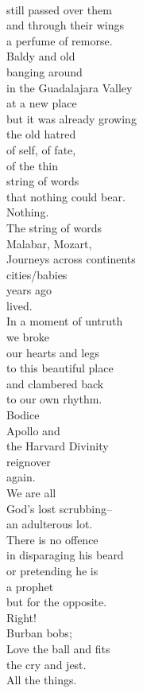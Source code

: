 \documentclass[smalldemyvopaper,11pt,twoside,onecolumn,openright,extrafontsizes]{memoir}
\begin{document}
\\still passed over them
\\and through their wings
\\a perfume of remorse.
\\Baldy and old
\\banging around
\\in the Guadalajara Valley
\\at a new place
\\but it was already growing
\\the old hatred
\\of self, of fate,
\\of the thin
\\string of words
\\that nothing could bear.
\\Nothing.
\\The string of words
\\Malabar, Mozart,
\\Journeys across continents
\\cities/babies
\\years ago
\\lived.
\\In a moment of untruth
\\we broke
\\our hearts and legs
\\to this beautiful place
\\and clambered back
\\to our own rhythm.
\\Bodice
\\Apollo and
\\the Harvard Divinity
\\reignover
\\again.
\\We are all
\\God's lost scrubbing--
\\an adulterous lot.
\\There is no offence
\\in disparaging his beard
\\or pretending he is
\\a prophet
\\but for the opposite.
\\Right!
\\Burban bobs;
\\Love the ball and fits
\\the cry and jest.
\\All the things.
\end{document}
